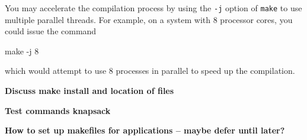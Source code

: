 You may accelerate the compilation process by using the \texttt{-j} option of
\texttt{make} to use multiple parallel threads.  For example, on a system with
8 processor cores, you could issue the command
\begin{codeblock}
make -j 8
\end{codeblock}
which would attempt to use 8 processes in parallel to speed up the compilation.

\textbf{Discuss make install and location of files}

\textbf{Test commands knapsack}

\textbf{How to set up makefiles for applications -- maybe defer until later?}
